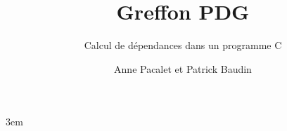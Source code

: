 \documentclass[lang=french]{frama-c-book}
\title{Greffon PDG}
\subtitle{Calcul de dépendances dans un programme C}
\author{Anne Pacalet et Patrick Baudin}
\begin{document}
\sloppy
\emergencystretch 3em

\maketitle


\end{document}
